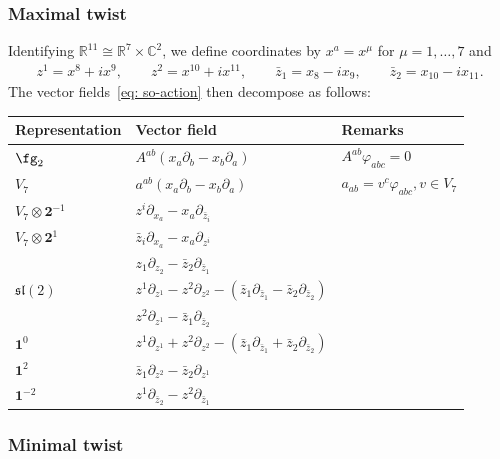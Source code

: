 \documentclass[pdftex]{sigma}
\numberwithin{equation}{section}
\theoremstyle{definition}
\def\R{\mathbb{R}}
\def\C{\mathbb{C}}
\def\lie#1{\ensuremath{\mathfrak{#1}}}
\begin{document}
\subsubsection{Maximal twist}
Identifying $\R^{11} \cong \R^7 \times \C^2$, we define coordinates by $x^a = x^\mu$ for $\mu = 1,\dots, 7$ and
\begin{gather*}
 z^1 = x^{8} + i x^{9} , \qquad z^2 = x^{10} + i x^{11},\qquad
 \bar{z}_1 = x_{8} - i x_{9} , \qquad \bar{z}_2 = x_{10} - i x_{11}.
\end{gather*}
The vector fields~\eqref{eq: so-action} then decompose as follows:
\begin{table}[!ht]\renewcommand{\arraystretch}{1.2}
\centering
\begin{tabular}{|l|l|l|}
\hline
Representation & Vector field & Remarks \\ \hline
\(\fg_2\) & \(A^{ab} (x_a \partial_b - x_b \partial_a)\) & \(A^{ab} \varphi_{abc} = 0\) \\
\hline
\(V_7\) & \(a^{ab} (x_a \partial_b - x_b \partial_a)\) & \(a_{ab} = v^c \varphi_{abc}, v \in V_7\) \\
 \hline
\(V_7 \otimes \textbf{2}^{-1}\) & \(z^i \partial_{x_a} - x_a \partial_{\bar{z}_i}\) & \\
\hline
\(V_7 \otimes \textbf{2}^{1}\) & \(\bar{z}_i \partial_{x_a} - x_a \partial_{z^i} \) & \\
\hline
 & \(z_1 \partial_{z_2} - \bar{z}_2 \partial_{\bar{z}_1}\) & \\
\(\lie{sl}(2)\) & \(z^1 \partial_{z^1} - z^2 \partial_{z^2} - (\bar{z}_1 \partial_{\bar{z}_1} - \bar{z}_2 \partial_{\bar{z}_2})\) & \\
 & \(z^2 \partial_{z^1} - \bar{z}_1 \partial_{\bar{z}_2}\) & \\
\hline
\(\textbf{1}^{0}\) & \(z^1 \partial_{z^1} + z^2 \partial_{z^2} - (\bar{z}_1 \partial_{\bar{z}_1} + \bar{z}_2 \partial_{\bar{z}_2})\) & \\
 \hline
\(\textbf{1}^{2}\) & \(\bar{z}_1 \partial_{z^2} - \bar{z}_2 \partial_{z^1}\) & \\
 \hline
\(\textbf{1}^{-2}\) & \(z^1 \partial_{\bar{z}_2} - z^2 \partial_{\bar{z}_1}\)& \\
\hline
\end{tabular}
\end{table}

\pagebreak

\subsubsection{Minimal twist}
\end{document}
